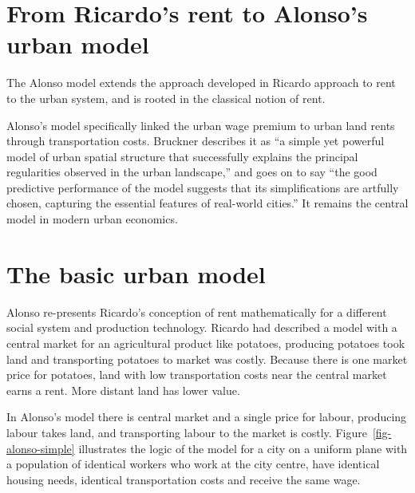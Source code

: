 

\section{From Ricardo's rent to Alonso's urban model}


The Alonso model extends the approach developed in Ricardo approach to rent to the urban system, and is %
rooted in the classical notion of rent. 

 Alonso's  model  specifically linked the urban wage premium to urban land rents through transportation costs. Bruckner \cite{bruecknerStructureUrbanEquilibria1987} describes it as ``a simple yet powerful model of urban spatial structure that successfully explains the principal regularities observed in the urban landscape,'' and goes on to say ``the good predictive performance of the model suggests that its simplifications are artfully chosen, capturing the essential features of real-world cities.'' It remains the central model in modern urban economics.

\section{The basic urban model}
Alonso re-presents Ricardo's conception of rent mathematically for a different social system and production technology.  Ricardo had described a model with a central market for an agricultural product like potatoes, producing potatoes took land and transporting potatoes to market was costly. Because there is one market price for potatoes, land with low transportation costs near the central market earns a rent. More distant land has lower value. 

In Alonso's model there is central market and a single price for labour, producing labour takes land, and transporting labour to the market is costly. Figure~\ref{fig-alonso-simple} illustrates the logic of the model for a city on a uniform plane with a population of identical workers who work at the city centre, have identical housing needs, identical transportation costs and receive the same wage. 

